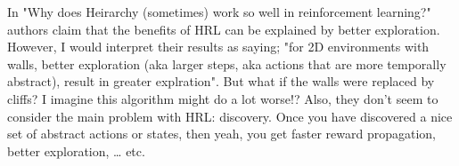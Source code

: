 In "Why does Heirarchy (sometimes) work so well in reinforcement learning?" \cite{Dadashi2018}
authors claim that the benefits of HRL can be explained by better
exploration. However, I would interpret their results as saying; "for
2D environments with walls, better exploration (aka larger steps, aka actions that are more temporally abstract), result in greater
explration". But what if the walls were replaced by cliffs? I imagine
this algorithm might do a lot worse!? Also, they don't seem to consider the main problem with HRL: discovery.
Once you have discovered a nice set of abstract actions or states, then yeah,
you get faster reward propagation, better exploration, \ldots{} etc.
